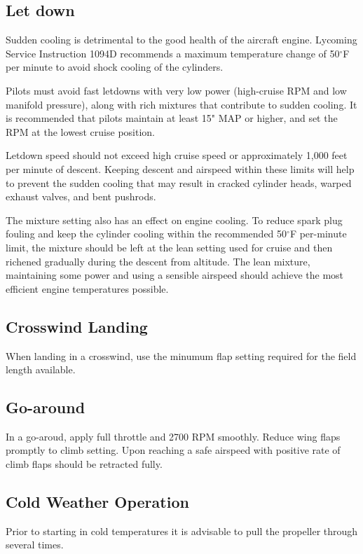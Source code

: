 \subsection{Let down}
Sudden cooling is detrimental to the good health of the aircraft engine. Lycoming Service Instruction 1094D recommends a maximum temperature change of 50${^\circ}$F per minute to avoid shock cooling of the cylinders.

Pilots must avoid fast letdowns with very low power (high-cruise RPM and low manifold pressure), along with rich mixtures that contribute to sudden cooling. It is recommended that pilots maintain at least 15" MAP or higher, and set the RPM at the lowest cruise position. 

Letdown speed should not exceed high cruise speed or approximately 1,000 feet per minute of descent. Keeping descent and airspeed within these limits will help to prevent the sudden cooling that may result in cracked cylinder heads, warped exhaust valves, and bent pushrods.

The mixture setting also has an effect on engine cooling. To reduce spark plug fouling and keep the cylinder cooling within the recommended 50${^\circ}$F per-minute limit, the mixture should be left at the lean setting used for cruise and then richened gradually during the descent from altitude. The lean mixture, maintaining some power and using a sensible airspeed should achieve the most efficient engine temperatures possible.



\subsection{Crosswind Landing }
When landing in a crosswind, use the minumum flap setting required for the field length available.

\subsection{Go-around }
In a go-aroud, apply full throttle and 2700 RPM smoothly.  Reduce wing flaps promptly to climb setting.   Upon reaching a safe airspeed with positive rate of climb flaps should be retracted fully.

\subsection{Cold Weather Operation}
Prior to starting in cold temperatures it is advisable to pull the propeller through several times.  

